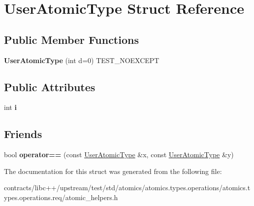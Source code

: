 \hypertarget{struct_user_atomic_type}{}\section{User\+Atomic\+Type Struct Reference}
\label{struct_user_atomic_type}
\subsection*{Public Member Functions}
\begin{DoxyCompactItemize}
\item 
\mbox{\label{struct_user_atomic_type_aec475046864e95e9d2a95086e323cfa6}} 
{\bfseries User\+Atomic\+Type} (int d=0) T\+E\+S\+T\+\_\+\+N\+O\+E\+X\+C\+E\+PT
\end{DoxyCompactItemize}
\subsection*{Public Attributes}
\begin{DoxyCompactItemize}
\item 
\mbox{\label{struct_user_atomic_type_ac41a25edef105e8f306bdcb69880594a}} 
int {\bfseries i}
\end{DoxyCompactItemize}
\subsection*{Friends}
\begin{DoxyCompactItemize}
\item 
\mbox{\label{struct_user_atomic_type_a3f0011dd6fb62412f63dd1c2f94a934c}} 
bool {\bfseries operator==} (const \mbox{\hyperlink{struct_user_atomic_type}{User\+Atomic\+Type}} \&x, const \mbox{\hyperlink{struct_user_atomic_type}{User\+Atomic\+Type}} \&y)
\end{DoxyCompactItemize}


The documentation for this struct was generated from the following file\+:\begin{DoxyCompactItemize}
\item 
contracts/libc++/upstream/test/std/atomics/atomics.\+types.\+operations/atomics.\+types.\+operations.\+req/atomic\+\_\+helpers.\+h\end{DoxyCompactItemize}
